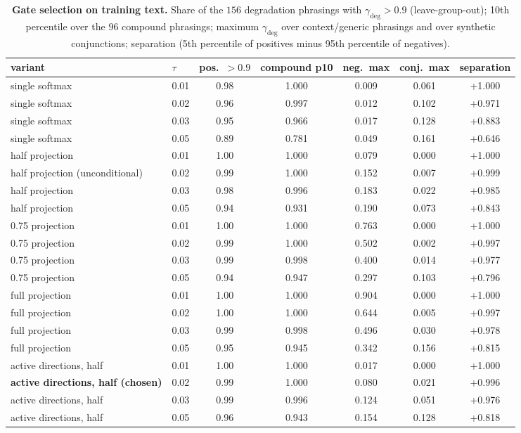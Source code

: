 \documentclass[10pt,letterpaper]{article}
\begin{document}
\begin{table}[h]\centering\small
\caption{\textbf{Gate selection on training text.} Share of the $156$
degradation phrasings with $\gamma_{\mathrm{deg}}>0.9$ (leave-group-out); 10th
percentile over the $96$ compound phrasings; maximum $\gamma_{\mathrm{deg}}$ over
context/generic phrasings and over synthetic conjunctions; separation (5th
percentile of positives minus 95th percentile of negatives).}
\label{tab:loo}
\begin{tabular}{llccccc}
\toprule
variant & $\tau$ & pos.\ $>0.9$ & compound p10 & neg.\ max & conj.\ max & separation\\
\midrule
single softmax & 0.01 & 0.98 & 1.000 & 0.009 & 0.061 & +1.000\\
single softmax & 0.02 & 0.96 & 0.997 & 0.012 & 0.102 & +0.971\\
single softmax & 0.03 & 0.95 & 0.966 & 0.017 & 0.128 & +0.883\\
single softmax & 0.05 & 0.89 & 0.781 & 0.049 & 0.161 & +0.646\\
half projection & 0.01 & 1.00 & 1.000 & 0.079 & 0.000 & +1.000\\
half projection (unconditional) & 0.02 & 0.99 & 1.000 & 0.152 & 0.007 & +0.999\\
half projection & 0.03 & 0.98 & 0.996 & 0.183 & 0.022 & +0.985\\
half projection & 0.05 & 0.94 & 0.931 & 0.190 & 0.073 & +0.843\\
0.75 projection & 0.01 & 1.00 & 1.000 & 0.763 & 0.000 & +1.000\\
0.75 projection & 0.02 & 0.99 & 1.000 & 0.502 & 0.002 & +0.997\\
0.75 projection & 0.03 & 0.99 & 0.998 & 0.400 & 0.014 & +0.977\\
0.75 projection & 0.05 & 0.94 & 0.947 & 0.297 & 0.103 & +0.796\\
full projection & 0.01 & 1.00 & 1.000 & 0.904 & 0.000 & +1.000\\
full projection & 0.02 & 1.00 & 1.000 & 0.644 & 0.005 & +0.997\\
full projection & 0.03 & 0.99 & 0.998 & 0.496 & 0.030 & +0.978\\
full projection & 0.05 & 0.95 & 0.945 & 0.342 & 0.156 & +0.815\\
\midrule
active directions, half & 0.01 & 1.00 & 1.000 & 0.017 & 0.000 & +1.000\\
\textbf{active directions, half (chosen)} & 0.02 & 0.99 & 1.000 & 0.080 & 0.021 & +0.996\\
active directions, half & 0.03 & 0.99 & 0.996 & 0.124 & 0.051 & +0.976\\
active directions, half & 0.05 & 0.96 & 0.943 & 0.154 & 0.128 & +0.818\\
\bottomrule
\end{tabular}
\end{table}
\end{document}
